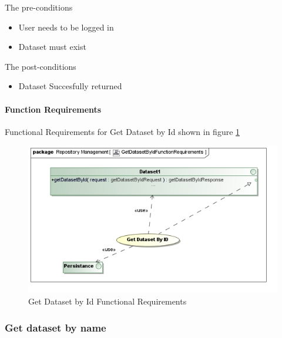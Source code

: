 The pre-conditions
\begin{itemize}
  \item User needs to be logged in
  \item Dataset must exist
\end{itemize}

The post-conditions
\begin{itemize}
  \item Dataset Succesfully returned
\end{itemize}

\paragraph{Function Requirements}
Functional Requirements for Get Dataset by Id shown in figure \ref{fig:getDatasetByIdFunctionalRequirements}

\begin{figure}[H]
  \begin{center}
  \includegraphics[scale=0.6]{../Diagrams and Charts/Test Data/GetDatasetByIdFunctionRequirements.jpg}
  \caption{Get Dataset by Id Functional Requirements}
  \label{fig:getDatasetByIdFunctionalRequirements}
  \end{center}
  
\end{figure}

\subsubsection {Get dataset by name}

